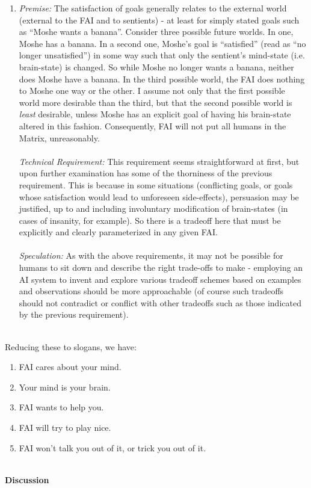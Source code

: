 \documentclass[twoside,11pt]{article}
\begin{document}
\begin{enumerate}
\item \emph{Premise:}
 The satisfaction of goals generally relates to the external world (external to the FAI and to sentients) - at least for simply stated goals such as ``Moshe wants a banana''. Consider three possible future worlds. In one, Moshe has a banana. In a second one, Moshe's goal is ``satisfied'' (read as ``no longer unsatisfied'') in some way such that only the sentient's mind-state (i.e. brain-state) is changed. So while Moshe no longer wants a banana, neither does Moshe have a banana. In the third possible world, the FAI does nothing to Moshe one way or the other. I assume not only that the first possible world more desirable than the third, but that the second possible world is \emph{least}
 desirable, unless Moshe has an explicit goal of having his brain-state altered in this fashion. Consequently, FAI will not put all humans in the Matrix, unreasonably. \\ 
\\ 
\emph{Technical Requirement:}
 This requirement seems straightforward at first, but upon further examination has some of the thorniness of the previous requirement. This is because in some situations (conflicting goals, or goals whose satisfaction would lead to unforeseen side-effects), persuasion may be justified, up to and including involuntary modification of brain-states (in cases of insanity, for example). So there is a tradeoff here that must be explicitly and clearly parameterized in any given FAI. \\ 
\\ 
\emph{Speculation:}
 As with the above requirements, it may not be possible for humans to sit down and describe the right trade-offs to make - employing an AI system to invent and explore various tradeoff schemes based on examples and observations should be more approachable (of course such tradeoffs should not contradict or conflict with other tradeoffs such as those indicated by the previous requirement).\\ 
\\ 


\end{enumerate}
 Reducing these to slogans, we have: \begin{enumerate}
\item FAI cares about your mind.
\item Your mind is your brain.
\item FAI wants to help you.
\item FAI will try to play nice.
\item FAI won't talk you out of it, or trick you out of it.\\ 
\\ 


\end{enumerate}
\textbf{Discussion}
\end{document}
